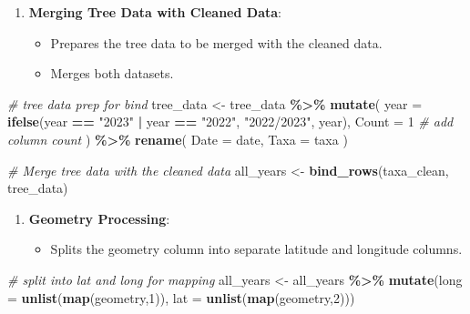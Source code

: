 \documentclass[
]{book}
\newenvironment{Shaded}{\begin{snugshade}}{\end{snugshade}}
\newcommand{\AttributeTok}[1]{\textcolor[rgb]{0.13,0.29,0.53}{#1}}
\newcommand{\CommentTok}[1]{\textcolor[rgb]{0.56,0.35,0.01}{\textit{#1}}}
\newcommand{\DecValTok}[1]{\textcolor[rgb]{0.00,0.00,0.81}{#1}}
\newcommand{\FunctionTok}[1]{\textcolor[rgb]{0.13,0.29,0.53}{\textbf{#1}}}
\newcommand{\NormalTok}[1]{#1}
\newcommand{\OtherTok}[1]{\textcolor[rgb]{0.56,0.35,0.01}{#1}}
\newcommand{\SpecialCharTok}[1]{\textcolor[rgb]{0.81,0.36,0.00}{\textbf{#1}}}
\newcommand{\StringTok}[1]{\textcolor[rgb]{0.31,0.60,0.02}{#1}}
\providecommand{\tightlist}{%
  \setlength{\itemsep}{0pt}\setlength{\parskip}{0pt}}
\begin{document}
\begin{enumerate}
\def\labelenumi{\arabic{enumi}.}
\setcounter{enumi}{7}
\tightlist
\item
  \textbf{Merging Tree Data with Cleaned Data}:

  \begin{itemize}
  \tightlist
  \item
    Prepares the tree data to be merged with the cleaned data.
  \item
    Merges both datasets.
  \end{itemize}
\end{enumerate}

\begin{Shaded}
\begin{Highlighting}[]
\CommentTok{\# tree data prep for bind}
\NormalTok{tree\_data }\OtherTok{\textless{}{-}}\NormalTok{ tree\_data }\SpecialCharTok{\%\textgreater{}\%}
  \FunctionTok{mutate}\NormalTok{(}
    \AttributeTok{year =} \FunctionTok{ifelse}\NormalTok{(year }\SpecialCharTok{==} \StringTok{"2023"} \SpecialCharTok{|}\NormalTok{ year }\SpecialCharTok{==} \StringTok{"2022"}\NormalTok{, }\StringTok{"2022/2023"}\NormalTok{, year),}
    \AttributeTok{Count =} \DecValTok{1} \CommentTok{\# add column count }
\NormalTok{  ) }\SpecialCharTok{\%\textgreater{}\%}
  \FunctionTok{rename}\NormalTok{(}
    \AttributeTok{Date =}\NormalTok{ date,}
    \AttributeTok{Taxa =}\NormalTok{ taxa}
\NormalTok{  )}

\CommentTok{\# Merge tree data with the cleaned data}
\NormalTok{all\_years }\OtherTok{\textless{}{-}} \FunctionTok{bind\_rows}\NormalTok{(taxa\_clean, tree\_data)}
\end{Highlighting}
\end{Shaded}

\begin{enumerate}
\def\labelenumi{\arabic{enumi}.}
\setcounter{enumi}{8}
\tightlist
\item
  \textbf{Geometry Processing}:

  \begin{itemize}
  \tightlist
  \item
    Splits the geometry column into separate latitude and longitude columns.
  \end{itemize}
\end{enumerate}

\begin{Shaded}
\begin{Highlighting}[]
\CommentTok{\# split into lat and long for mapping }
\NormalTok{all\_years }\OtherTok{\textless{}{-}}\NormalTok{ all\_years }\SpecialCharTok{\%\textgreater{}\%} \FunctionTok{mutate}\NormalTok{(}\AttributeTok{long =} \FunctionTok{unlist}\NormalTok{(}\FunctionTok{map}\NormalTok{(geometry,}\DecValTok{1}\NormalTok{)),}
           \AttributeTok{lat =} \FunctionTok{unlist}\NormalTok{(}\FunctionTok{map}\NormalTok{(geometry,}\DecValTok{2}\NormalTok{)))}
\end{Highlighting}
\end{Shaded}
\end{document}
